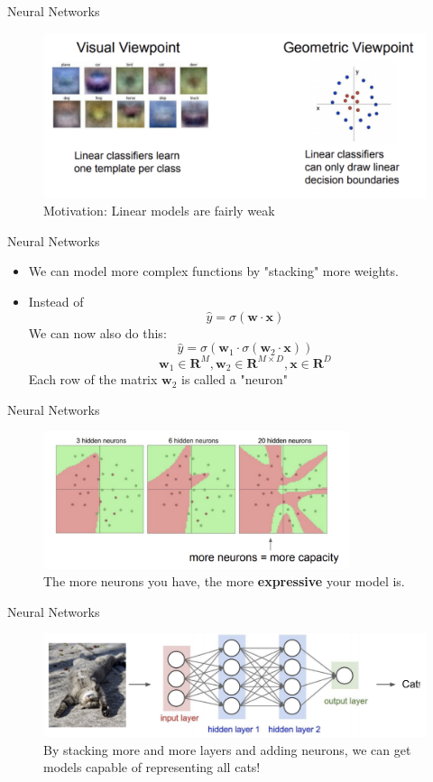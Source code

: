 \begin{frame}{Neural Networks}
\begin{figure}
    \centering
    \includegraphics[width=\textwidth]{img/linearweak.png}
    \caption{Motivation: Linear models are fairly weak}
\end{figure}
\end{frame}

\begin{frame}{Neural Networks}
\begin{itemize}
    \item We can model more complex functions by "stacking" more weights.
    \item Instead of
    $$\hat{y} = \sigma(\textbf{w} \cdot \textbf{x})$$
    We can now also do this:
    $$\hat{y} = \sigma(\textbf{w}_1 \cdot \sigma(\textbf{w}_2 \cdot \textbf{x}))$$
    $$\textbf{w}_1 \in \mathbf{R}^M, \textbf{w}_2 \in \textbf{R}^{M \times D}, \textbf{x} \in \textbf{R}^D$$
    Each row of the matrix $\textbf{w}_2$ is called a "neuron"
\end{itemize}
\end{frame}

\begin{frame}{Neural Networks}
\begin{figure}
    \centering
    \includegraphics[width=0.8\textwidth]{img/moreneuronmorecap.png}
    \caption{The more neurons you have, the more \textbf{expressive} your model is.}
\end{figure}
\end{frame}

\begin{frame}{Neural Networks}
\begin{figure}
    \centering
    \includegraphics[width=\textwidth]{img/catNN.png}
    \caption{By stacking more and more layers and adding neurons, we can get models capable of representing all cats!}
\end{figure}
\end{frame}